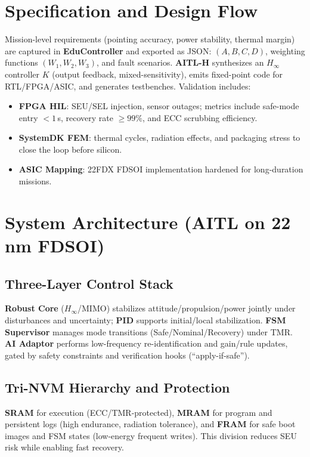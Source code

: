 \documentclass[conference]{IEEEtran}
\begin{document}
\section{Specification and Design Flow}
Mission-level requirements (pointing accuracy, power stability, thermal margin) are
captured in \textbf{EduController} and exported as JSON: $(A,B,C,D)$, weighting functions
$(W_1,W_2,W_3)$, and fault scenarios. \textbf{AITL-H} synthesizes an $H_\infty$ controller
$K$ (output feedback, mixed-sensitivity), emits fixed-point code for RTL/FPGA/ASIC, and
generates testbenches. Validation includes:
\begin{itemize}
  \item \textbf{FPGA HIL}: SEU/SEL injection, sensor outages; metrics include safe-mode entry
  $<\!1$\,s, recovery rate $\ge\!99\%$, and ECC scrubbing efficiency.
  \item \textbf{SystemDK FEM}: thermal cycles, radiation effects, and packaging stress to
  close the loop before silicon.
  \item \textbf{ASIC Mapping}: 22FDX FDSOI implementation hardened for long-duration missions.
\end{itemize}

\section{System Architecture (AITL on 22\,nm FDSOI)}
\subsection{Three-Layer Control Stack}
\textbf{Robust Core} ($H_\infty$/MIMO) stabilizes attitude/propulsion/power jointly under
disturbances and uncertainty; \textbf{PID} supports initial/local stabilization.
\textbf{FSM Supervisor} manages mode transitions (Safe/Nominal/Recovery) under TMR.
\textbf{AI Adaptor} performs low-frequency re-identification and gain/rule updates, gated by
safety constraints and verification hooks (``apply-if-safe'').

\subsection{Tri-NVM Hierarchy and Protection}
\textbf{SRAM} for execution (ECC/TMR-protected), \textbf{MRAM} for program and persistent logs
(high endurance, radiation tolerance), and \textbf{FRAM} for safe boot images and FSM states
(low-energy frequent writes). This division reduces SEU risk while enabling fast recovery.
\end{document}
